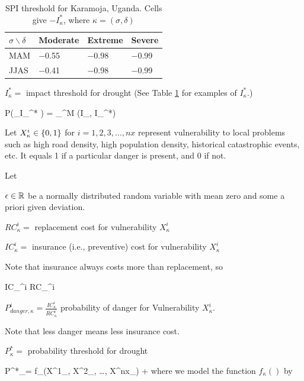 \documentclass[12pt]{article}
\begin{document}
\begin{table}[!h]
\begin{tabular}{|l|l|l|l|}
\hline
$\sigma\backslash\delta$ & \cellcolor[HTML]{FFFFC7}Moderate & \cellcolor[HTML]{FFFFC7}Extreme & \cellcolor[HTML]{FFFFC7}Severe \\ \hline
\cellcolor[HTML]{FFFFC7}MAM & $-$0.55 & $-$0.98 & $-$0.99 \\ \hline
\cellcolor[HTML]{FFFFC7}JJAS & $-$0.41 & $-$0.98 & $-$0.99 \\ \hline
\end{tabular}
\caption{SPI threshold  for Karamoja, Uganda.
Cells give $-I^*_\kappa$,
where $\kappa=(\sigma, \delta)$}
\label{tab-spi-karamoja}
\end{table}

$I_\kappa^*  =$ impact threshold 
   for drought (See Table
   \ref{tab-spi-karamoja}
   for examples
   of $I^*_\kappa$.)
   

\beq
P(\rvI_\kappa\geq I_\kappa^*  ) =  \sum_{}^{M} \indi(I_{\kappa,\mu} \geq I_\kappa^*) 
\eeq

Let $X^i_\kappa\in \{0,1\}$ for $i=1,2, 3, \ldots, nx$ represent vulnerability to local problems
such as high road density, high population density,
historical 
catastrophic events, etc.
It equals 1 if a particular danger is present, and 0 if not.

Let


$\epsilon \in { \mathbb{R}}$ be a normally distributed random variable
with mean zero and
some a priori
given deviation.

$RC_\kappa^i=$ replacement cost for 
vulnerability $X^i_\kappa$

$IC_\kappa^i=$  insurance (i.e., preventive) cost for vulnerability $X^i_\kappa$


Note that insurance always costs
more than replacement, so

\leq IC_\kappa^i \leq RC_\kappa^i
\eeq

$P_{danger, \kappa}^i=
\frac{IC_\kappa^i}{RC_\kappa^i}$ probability of danger for Vulnerability $X_\kappa^i$.

Note that less 
danger 
means less 
insurance cost.


$P^*_\kappa=$ probability threshold for drought

\beq
P^*_\kappa =
f_\kappa(X^1_\kappa, X^2_\kappa,
\ldots, X^{nx}_\kappa) + \eps 
\eeq
where we model the function $f_\kappa()$ by
\end{document}
